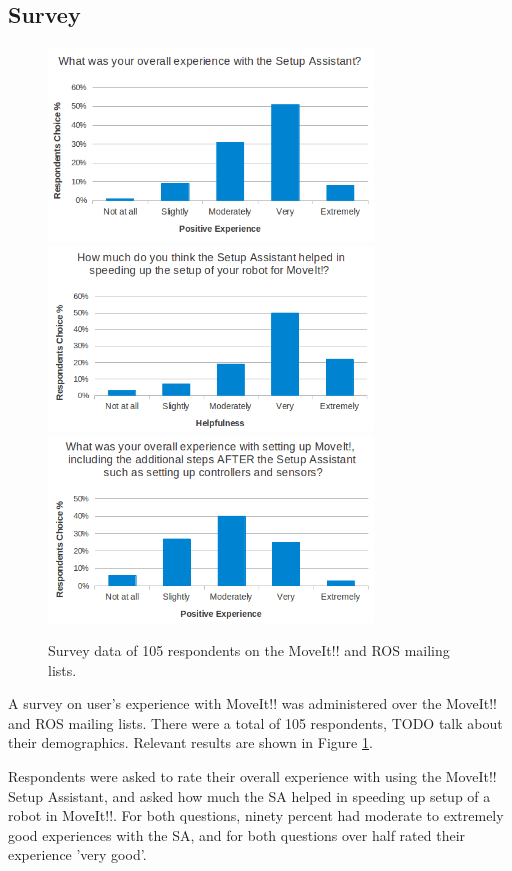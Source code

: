 \documentclass[10pt,journal,compsoc]{joser1}
\begin{document}
{\subsection{Survey}
\label{sec::survey}

\begin{figure}[!t]
\centering
\includegraphics[width=3.4in]{images/setup_assistant_positive}
\includegraphics[width=3.4in]{images/sa_speedup}
\includegraphics[width=3.4in]{images/moveit_after_sa}
\caption{Survey data of 105 respondents on the MoveIt!! and ROS mailing lists.}
\label{fig:setup_assistant_positive}
\end{figure} 

A survey on user's experience with MoveIt!! was administered over the MoveIt!! and ROS mailing lists. There were a total of 105 respondents, TODO talk about their demographics. Relevant results are shown in Figure \ref{fig:setup_assistant_positive}. 

Respondents were asked to rate their overall experience with using the MoveIt!! Setup Assistant, and asked how much the SA helped in speeding up setup of a robot in MoveIt!!. For both questions, ninety percent had moderate to extremely good experiences with the SA, and for both questions over half rated their experience 'very good'. 

}
\end{document}
